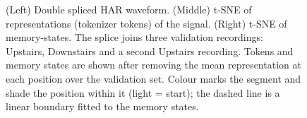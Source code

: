 \providecommand{\revtab}[1]{#1}
\providecommand{\rev}[1]{#1}
\begin{figure}[tb]
\centering
\resizebox{\linewidth}{!}{%
%
}
\caption{\revtab{(Left) Double spliced HAR waveform. (Middle) t-SNE of representations (\rev{tokenizer} tokens) of the signal. (Right) t-SNE of memory-states. \rev{The splice joins three validation recordings: Upstairs, Downstairs and a second Upstairs recording. Tokens and memory states are shown after removing the mean representation at each position over the validation set. Colour marks the segment and shade the position within it (light = start); the dashed line is a linear boundary fitted to the memory states.}}}
\label{fig:pca-repr-standing}
\end{figure}
